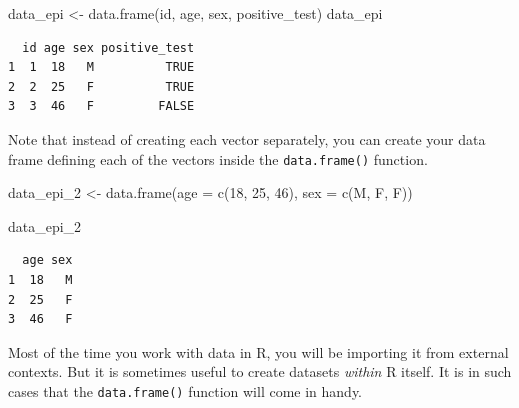 \documentclass[
  letterpaper,
  DIV=11,
  numbers=noendperiod]{scrreprt}
\newenvironment{Shaded}{\begin{snugshade}}{\end{snugshade}}
\newcommand{\AttributeTok}[1]{\textcolor[rgb]{0.40,0.45,0.13}{#1}}
\newcommand{\DecValTok}[1]{\textcolor[rgb]{0.68,0.00,0.00}{#1}}
\newcommand{\FunctionTok}[1]{\textcolor[rgb]{0.28,0.35,0.67}{#1}}
\newcommand{\NormalTok}[1]{\textcolor[rgb]{0.00,0.23,0.31}{#1}}
\newcommand{\OtherTok}[1]{\textcolor[rgb]{0.00,0.23,0.31}{#1}}
\newcommand{\StringTok}[1]{\textcolor[rgb]{0.13,0.47,0.30}{#1}}
\begin{document}
\begin{Shaded}
\begin{Highlighting}[]
\NormalTok{data\_epi }\OtherTok{\textless{}{-}} \FunctionTok{data.frame}\NormalTok{(id, age, sex, positive\_test)}
\NormalTok{data\_epi}
\end{Highlighting}
\end{Shaded}

\begin{verbatim}
  id age sex positive_test
1  1  18   M          TRUE
2  2  25   F          TRUE
3  3  46   F         FALSE
\end{verbatim}

Note that instead of creating each vector separately, you can create
your data frame defining each of the vectors inside the
\texttt{data.frame()} function.

\begin{Shaded}
\begin{Highlighting}[]
\NormalTok{data\_epi\_2 }\OtherTok{\textless{}{-}} \FunctionTok{data.frame}\NormalTok{(}\AttributeTok{age =} \FunctionTok{c}\NormalTok{(}\DecValTok{18}\NormalTok{, }\DecValTok{25}\NormalTok{, }\DecValTok{46}\NormalTok{), }
                         \AttributeTok{sex =} \FunctionTok{c}\NormalTok{(}\StringTok{\textquotesingle{}M\textquotesingle{}}\NormalTok{, }\StringTok{\textquotesingle{}F\textquotesingle{}}\NormalTok{, }\StringTok{\textquotesingle{}F\textquotesingle{}}\NormalTok{))}

\NormalTok{data\_epi\_2}
\end{Highlighting}
\end{Shaded}

\begin{verbatim}
  age sex
1  18   M
2  25   F
3  46   F
\end{verbatim}

\begin{tcolorbox}[enhanced jigsaw, colframe=quarto-callout-note-color-frame, rightrule=.15mm, opacityback=0, breakable, coltitle=black, colbacktitle=quarto-callout-note-color!10!white, bottomrule=.15mm, leftrule=.75mm, toprule=.15mm, arc=.35mm, bottomtitle=1mm, colback=white, left=2mm, opacitybacktitle=0.6, titlerule=0mm, title=\textcolor{quarto-callout-note-color}{\faInfo}\hspace{0.5em}{Side Note}, toptitle=1mm]

Most of the time you work with data in R, you will be importing it from
external contexts. But it is sometimes useful to create datasets
\emph{within} R itself. It is in such cases that the
\texttt{data.frame()} function will come in handy.

\end{tcolorbox}
\end{document}
